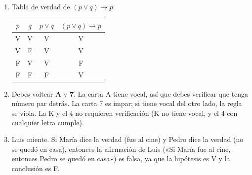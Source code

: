 \documentclass[12pt, letterpaper]{article}
\begin{document}
\begin{enumerate}[leftmargin=*, label=\textbf{\arabic*.}]
    \item Tabla de verdad de $(p \vee q) \rightarrow p$:
          \begin{center}
            \small
            \begin{tabular}{cc|c|c}
              $p$ & $q$ & $p \vee q$ & $(p \vee q) \rightarrow p$ \\
              \hline
              V   & V   & V          & V                          \\
              V   & F   & V          & V                          \\
              F   & V   & V          & F                          \\
              F   & F   & F          & V                          \\
            \end{tabular}
          \end{center}

    \item Debes voltear \textbf{A} y \textbf{7}. La carta A tiene vocal, así que debes verificar que tenga número par detrás. La carta 7 es impar; si tiene vocal del otro lado, la regla se viola. La K y el 4 no requieren verificación (K no tiene vocal, y el 4 con cualquier letra cumple).

    \item Luis miente. Si María dice la verdad (fue al cine) y Pedro dice la verdad (no se quedó en casa), entonces la afirmación de Luis («Si María fue al cine, entonces Pedro se quedó en casa») es falsa, ya que la hipótesis es V y la conclusión es F.


\end{enumerate}
\end{document}
